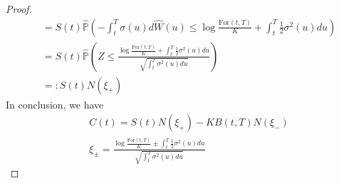 \documentclass[a4paper, 10pt]{article}
\theoremstyle{definition}
\theoremstyle{hSol}
\begin{document}
\begin{proof}
\begin{equation}
\begin{split}
    &= S(t) \widehat{\mathbb{P}}\left(-\int_t^T \sigma(u)d\widehat{W}(u)\leq \log\frac{\text{For}(t,T)}{K}+\int_t^T \frac{1}{2}\sigma^2(u)du\right) \\
    &=S(t)\widehat{\mathbb{P}}\left(Z \leq \frac{\log \frac{\text{For}(t,T)}{K} + \int_t^T \frac{1}{2}\sigma^2(u)du}{\sqrt{\int_t^T\sigma^2(u)du}}\right)\\
    &=:S(t)N(\xi_+)
  \end{split}
\end{equation}
In conclusion, we have
\begin{equation}
  \begin{split}
    &C(t) = S(t)N(\xi_+) - KB(t,T)N(\xi_-) \\
    &\xi_{\pm} = \frac{\log \frac{\text{For}(t,T)}{K} \pm \int_t^T \frac{1}{2}\sigma^2(u)du}{\sqrt{\int_t^T\sigma^2(u)du}}
  \end{split}
\end{equation}
\end{proof}
\end{document}
